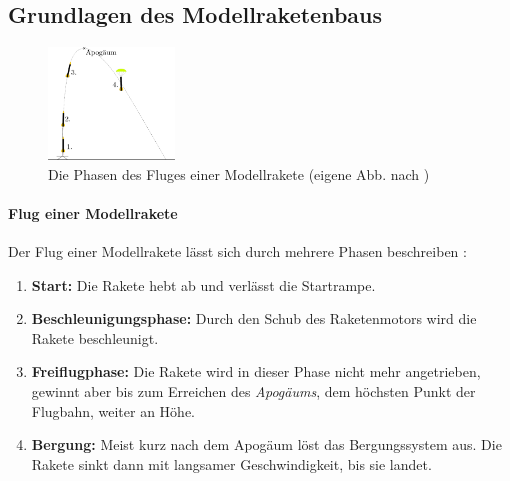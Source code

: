 \documentclass[10pt,a4paper]{article}
\begin{document}
\subsection{Grundlagen des Modellraketenbaus}
%
%	
%	
%	
%	

\begin{figure}
	\centering
	\includegraphics[width=0.3\textwidth]{Bilder/Flug-einer-Modellrakete.png}
	\caption{Die Phasen des Fluges einer Modellrakete (eigene Abb. nach \cite{sn})}
	\label{fig-Flug-einer-Modellrakete}
	\vspace{-45pt}
\end{figure}

\paragraph{Flug einer Modellrakete}
\label{sssec-Flug-einer-Modellrakete}
Der Flug einer Modellrakete lässt sich durch mehrere Phasen beschreiben \cite{om,sn}:
\begin{enumerate}
	\item \textbf{Start:} Die Rakete hebt ab und verlässt die Startrampe.
	\item \textbf{Beschleunigungsphase:} Durch den Schub des Raketenmotors wird die Rakete beschleunigt.
	\item \textbf{Freiflugphase:} Die Rakete wird in dieser Phase nicht mehr angetrieben, gewinnt aber bis zum Erreichen des \textit{Apogäums}, dem höchsten Punkt der Flugbahn, weiter an Höhe.
	\item \textbf{Bergung:} Meist kurz nach dem Apogäum löst das Bergungssystem aus. Die Rakete sinkt dann mit langsamer Geschwindigkeit, bis sie landet.
\end{enumerate}
\end{document}
